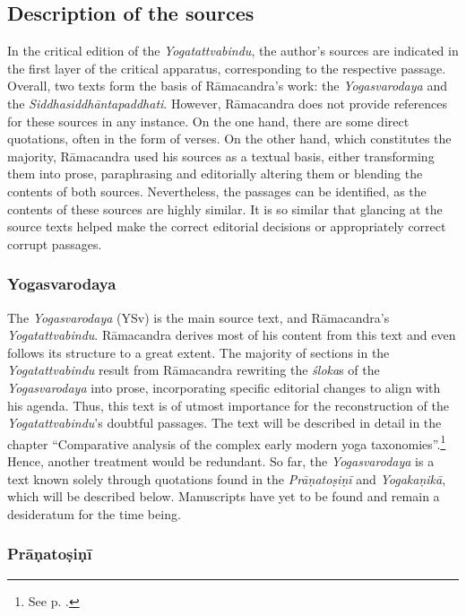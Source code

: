 \subsection{Description of the sources}

In the critical edition of the \emph{Yogatattvabindu}, the author's sources are indicated in the first layer of the critical apparatus, corresponding to the respective passage. Overall, two texts form the basis of Rāmacandra's work: the \emph{Yogasvarodaya} and the \emph{Siddhasiddhāntapaddhati}. However, Rāmacandra does not provide references for these sources in any instance. On the one hand, there are some direct quotations, often in the form of verses. On the other hand, which constitutes the majority, Rāmacandra used his sources as a textual basis, either transforming them into prose, paraphrasing and editorially altering them or blending the contents of both sources. Nevertheless, the passages can be identified, as the contents of these sources are highly similar. It is so similar that glancing at the source texts helped make the correct editorial decisions or appropriately correct corrupt passages.

\subsubsection{Yogasvarodaya}

The \emph{Yogasvarodaya} (YSv) is the main source text, and Rāmacandra's \emph{Yogatattvabindu}. Rāmacandra derives most of his content from this text and even follows its structure to a great extent. The majority of sections in the \emph{Yogatattvabindu} result from Rāmacandra rewriting the \emph{śloka}s of the \emph{Yogasvarodaya} into prose, incorporating specific editorial changes to align with his agenda. Thus, this text is of utmost importance for the reconstruction of the \emph{Yogatattvabindu}'s doubtful passages. The text will be described in detail in the chapter ``Comparative analysis of the complex early modern yoga taxonomies''.\footnote{See p. \pageref{yogasvarodayadescription}.} Hence, another treatment would be redundant. So far, the \emph{Yogasvarodaya} is a text known solely through quotations found in the \emph{Prāṇatoṣiṇī} and \emph{Yogakaṇikā}, which will be described below. Manuscripts have yet to be found and remain a desideratum for the time being. 

\subsubsection{Prāṇatoṣiṇī}

